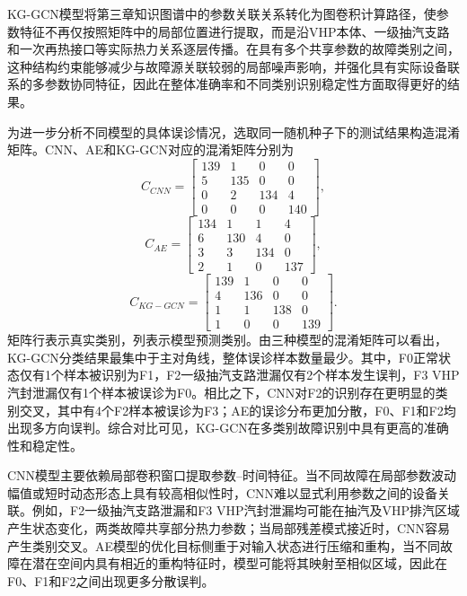 KG-GCN模型将第三章知识图谱中的参数关联关系转化为图卷积计算路径，使参数特征不再仅按照矩阵中的局部位置进行提取，而是沿VHP本体、一级抽汽支路和一次再热接口等实际热力关系逐层传播。在具有多个共享参数的故障类别之间，这种结构约束能够减少与故障源关联较弱的局部噪声影响，并强化具有实际设备联系的多参数协同特征，因此在整体准确率和不同类别识别稳定性方面取得更好的结果。

为进一步分析不同模型的具体误诊情况，选取同一随机种子下的测试结果构造混淆矩阵。CNN、AE和KG-GCN对应的混淆矩阵分别为
\begin{equation}
C_{CNN}=\begin{bmatrix}
139&1&0&0\\
5&135&0&0\\
0&2&134&4\\
0&0&0&140
\end{bmatrix},
\end{equation}
\begin{equation}
C_{AE}=\begin{bmatrix}
134&1&1&4\\
6&130&4&0\\
3&3&134&0\\
2&1&0&137
\end{bmatrix},
\end{equation}
\begin{equation}
C_{KG-GCN}=\begin{bmatrix}
139&1&0&0\\
4&136&0&0\\
1&1&138&0\\
1&0&0&139
\end{bmatrix}.
\end{equation}
矩阵行表示真实类别，列表示模型预测类别。由三种模型的混淆矩阵可以看出，KG-GCN分类结果最集中于主对角线，整体误诊样本数量最少。其中，F0正常状态仅有1个样本被识别为F1，F2一级抽汽支路泄漏仅有2个样本发生误判，F3 VHP汽封泄漏仅有1个样本被误诊为F0。相比之下，CNN对F2的识别存在更明显的类别交叉，其中有4个F2样本被误诊为F3；AE的误诊分布更加分散，F0、F1和F2均出现多方向误判。综合对比可见，KG-GCN在多类别故障识别中具有更高的准确性和稳定性。

CNN模型主要依赖局部卷积窗口提取参数--时间特征。当不同故障在局部参数波动幅值或短时动态形态上具有较高相似性时，CNN难以显式利用参数之间的设备关联。例如，F2一级抽汽支路泄漏和F3 VHP汽封泄漏均可能在抽汽及VHP排汽区域产生状态变化，两类故障共享部分热力参数；当局部残差模式接近时，CNN容易产生类别交叉。AE模型的优化目标侧重于对输入状态进行压缩和重构，当不同故障在潜在空间内具有相近的重构特征时，模型可能将其映射至相似区域，因此在F0、F1和F2之间出现更多分散误判。

